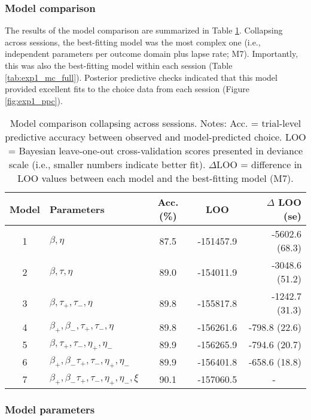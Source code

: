 \documentclass[a4paper,12pt]{article}
\begin{document}
\begin{refsection}[main]
\subsubsection*{Model comparison}

The results of the model comparison are summarized in Table \ref{tab:exp1_mc_abbr}. Collapsing across sessions, the best-fitting model was the most complex one (i.e., independent parameters per outcome domain plus lapse rate; M7). Importantly, this was also the best-fitting model within each session (Table \ref{tab:exp1_mc_full}). Posterior predictive checks indicated that this model provided excellent fits to the choice data from each session (Figure \ref{fig:exp1_ppc}). 

\begin{table}[b!]
    \centering
    \begin{tabular}{clccr}
        \toprule
        Model & Parameters & Acc. (\%) & LOO & $\Delta$ LOO (se) \\
        \midrule
        1 & $\beta, \eta$ & 87.5 & -151457.9 & -5602.6 (68.3) \\
        2 & $\beta, \tau, \eta$ & 89.0 & -154011.9 & -3048.6 (51.2) \\
        3 & $\beta, \tau_+, \tau_-, \eta$ & 89.8 & -155817.8 & -1242.7 (31.3) \\
        4 & $\beta_+, \beta_-, \tau_+, \tau_-, \eta$ & 89.8 & -156261.6 & -798.8 (22.6) \\
        5 & $\beta, \tau_+, \tau_-, \eta_+, \eta_-$ & 89.9 & -156265.9 & -794.6 (20.7) \\
        6 & $\beta_+, \beta_- \tau_+, \tau_-, \eta_+, \eta_-$ & 89.9 & -156401.8 & -658.6 (18.8) \\
        7 & $\beta_+, \beta_- \tau_+, \tau_-, \eta_+, \eta_-, \xi$ & 90.1 & -157060.5 & \multicolumn{1}{c}{-} \\
        \bottomrule
\end{tabular}
    \caption{Model comparison collapsing across sessions. Notes: Acc. = trial-level predictive accuracy between observed and model-predicted choice. LOO = Bayesian leave-one-out cross-validation scores presented in deviance scale (i.e., smaller numbers indicate better fit). $\Delta$LOO = difference in LOO values between each model and the best-fitting model (M7).}
    \label{tab:exp1_mc_abbr}
\end{table}

\subsubsection*{Model parameters}


\end{refsection}
\end{document}
